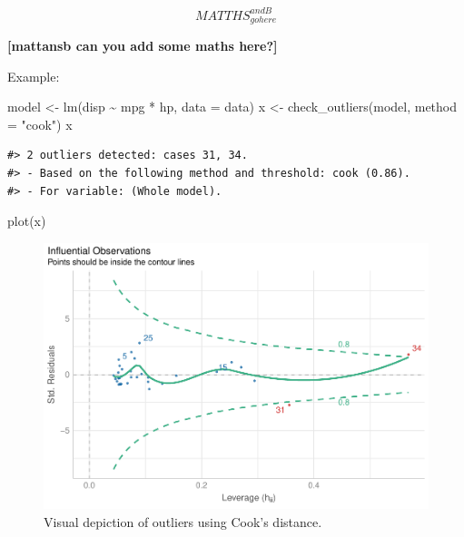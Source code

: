 \documentclass[
]{article}
\newenvironment{Shaded}{\begin{snugshade}}{\end{snugshade}}
\newcommand{\AttributeTok}[1]{\textcolor[rgb]{0.77,0.63,0.00}{#1}}
\newcommand{\FunctionTok}[1]{\textcolor[rgb]{0.00,0.00,0.00}{#1}}
\newcommand{\NormalTok}[1]{#1}
\newcommand{\OtherTok}[1]{\textcolor[rgb]{0.56,0.35,0.01}{#1}}
\newcommand{\SpecialCharTok}[1]{\textcolor[rgb]{0.00,0.00,0.00}{#1}}
\newcommand{\StringTok}[1]{\textcolor[rgb]{0.31,0.60,0.02}{#1}}
\begin{document}
\[
MATTHS_{gohere}^{andB}
\]

\textbf{{[}mattansb can you add some maths here?{]}}

Example:



\begin{Shaded}
\begin{Highlighting}[]
\NormalTok{model }\OtherTok{\textless{}{-}} \FunctionTok{lm}\NormalTok{(disp }\SpecialCharTok{\textasciitilde{}}\NormalTok{ mpg }\SpecialCharTok{*}\NormalTok{ hp, }\AttributeTok{data =}\NormalTok{ data)}
\NormalTok{x }\OtherTok{\textless{}{-}} \FunctionTok{check\_outliers}\NormalTok{(model, }\AttributeTok{method =} \StringTok{"cook"}\NormalTok{)}
\NormalTok{x}
\end{Highlighting}
\end{Shaded}

\begin{verbatim}
#> 2 outliers detected: cases 31, 34.
#> - Based on the following method and threshold: cook (0.86).
#> - For variable: (Whole model).
\end{verbatim}

\begin{Shaded}
\begin{Highlighting}[]
\FunctionTok{plot}\NormalTok{(x)}
\end{Highlighting}
\end{Shaded}

\begin{figure}
\includegraphics[width=1\linewidth]{paper_files/figure-latex/model-1} \caption{Visual depiction of outliers using Cook's distance.}\label{fig:model}
\end{figure}
\end{document}
